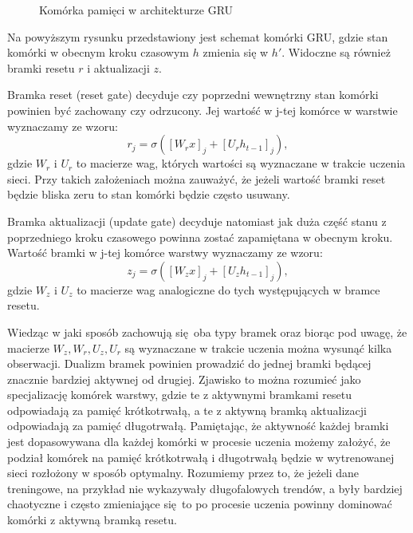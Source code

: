 \documentclass[10pt,a4paper]{article}
\begin{document}
\begin{figure}[!ht]
	\centering
	\caption{Komórka pamięci w architekturze GRU}
\end{figure}
\FloatBarrier

Na powyższym rysunku przedstawiony jest schemat komórki GRU, gdzie stan komórki w obecnym kroku czasowym $h$ zmienia się w $h'$. Widoczne są również bramki resetu $r$ i aktualizacji $z$. 

Bramka reset (reset gate) decyduje czy poprzedni wewnętrzny stan komórki powinien być zachowany czy odrzucony. Jej wartość w j-tej komórce w warstwie wyznaczamy ze wzoru:
\begin{equation}
	r_j = \sigma([W_rx]_j + [U_rh_{t-1}]_j),
\end{equation} 
gdzie $W_r$ i $U_r$ to macierze wag, których wartości są wyznaczane w trakcie uczenia sieci. Przy takich założeniach można zauważyć, że jeżeli wartość bramki reset będzie bliska zeru to stan komórki będzie często usuwany.

Bramka aktualizacji (update gate) decyduje natomiast jak duża część stanu z poprzedniego kroku czasowego powinna zostać zapamiętana w obecnym kroku. Wartość bramki w j-tej komórce warstwy wyznaczamy ze wzoru:
\begin{equation}
	z_j = \sigma([W_zx]_j + [U_zh_{t-1}]_j),
\end{equation} 
gdzie $W_z$ i $U_z$ to macierze wag analogiczne do tych występujących w bramce resetu. 

Wiedząc w jaki sposób zachowują się oba typy bramek oraz biorąc pod uwagę, że macierze $W_z, W_r, U_z, U_r$ są wyznaczane w trakcie uczenia można wysunąć kilka obserwacji. Dualizm bramek powinien prowadzić do jednej bramki będącej znacznie bardziej aktywnej od drugiej. Zjawisko to można rozumieć jako specjalizację komórek warstwy, gdzie te z aktywnymi bramkami resetu odpowiadają za pamięć krótkotrwałą, a te z aktywną bramką aktualizacji odpowiadają za pamięć długotrwałą. Pamiętając, że aktywność każdej bramki jest dopasowywana dla każdej komórki w procesie uczenia możemy założyć, że podział komórek na pamięć krótkotrwałą i długotrwałą będzie w wytrenowanej sieci rozłożony w sposób optymalny. Rozumiemy przez to, że jeżeli dane treningowe, na przykład nie wykazywały długofalowych trendów, a były bardziej chaotyczne i często zmieniające się to po procesie uczenia powinny dominować komórki z aktywną bramką resetu.
\end{document}
